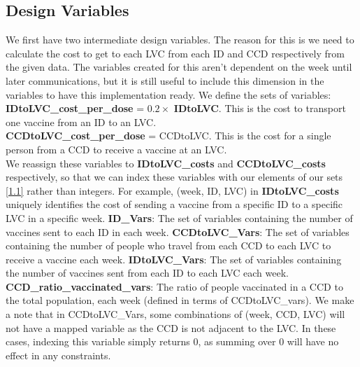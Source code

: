 \documentclass[12pt]{article}
\begin{document}
        \subsection{Design Variables}
        We first have two intermediate design variables. The reason for this is we need to calculate the cost to get to each LVC from each ID and CCD respectively from the given data. The variables created for this aren't dependent on the week until later communications, but it is still useful to include this dimension in the variables to have this implementation ready.
        \vskip 0.2cm
        We define the sets of variables:
        \textbf{IDtoLVC\_cost\_per\_dose} = \(0.2 \times\) \textbf{IDtoLVC}. This is the cost to transport one vaccine from an ID to an LVC.\\
        \textbf{CCDtoLVC\_cost\_per\_dose} = CCDtoLVC. This is the cost for a single person from a CCD to receive a vaccine at an LVC.\\
	We reassign these variables to \textbf{IDtoLVC\_costs} and \textbf{CCDtoLVC\_costs} respectively, so that we can index these variables with our elements of our sets \ref{1.1} rather than integers. For example, (week, ID, LVC) in \textbf{IDtoLVC\_costs} uniquely identifies the cost of sending a vaccine from a specific ID to a specific LVC in a specific week. 
        \vskip 0.3cm
        \noindent\textbf{ID\_Vars}: The set of variables containing the number of vaccines sent to each ID in each week.
        \vskip 0.2cm
        \noindent\textbf{CCDtoLVC\_Vars}: The set of variables containing the number of people who travel from each CCD to each LVC to receive a vaccine each week.
        \vskip 0.2cm
        \noindent\textbf{IDtoLVC\_Vars}: The set of variables containing the number of vaccines sent from each ID to each LVC each week.
        \vskip 0.2cm
	    \noindent\textbf{CCD\_ratio\_vaccinated\_vars}: The ratio of people vaccinated in a CCD to the total population, each week (defined in terms of CCDtoLVC\_vars).
        \vskip 0.2cm
	We make a note that in CCDtoLVC\_Vars, some combinations of (week, CCD, LVC) will not have a mapped variable as the CCD is not adjacent to the LVC. In these cases, indexing this variable simply returns \(0\), as summing over \(0\) will have no effect in any constraints.\\
\end{document}
